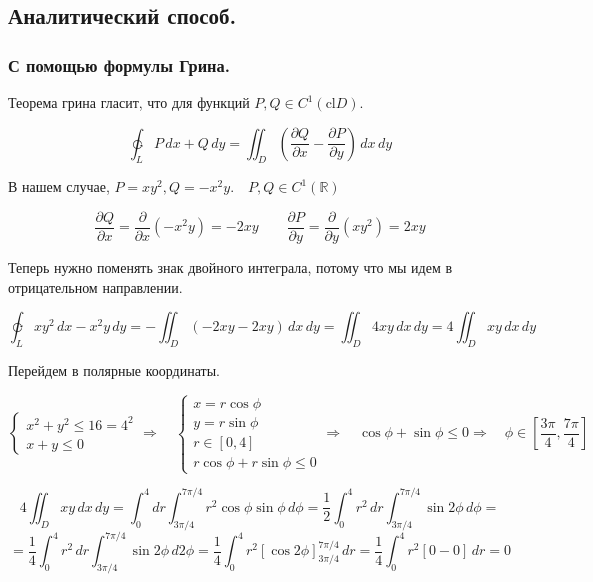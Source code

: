 \subsection{Аналитический способ.}
\subsubsection{С помощью формулы Грина.}
\begin{center}
    
Теорема грина гласит, что для функций $P,Q \in C^1(\text{cl}D)$.

$$\ointctrclockwise_{L} P \, dx + Q \, dy = \iint_{D} \left( \dfrac{\partial Q}{\partial x} - \dfrac{\partial P}{\partial y} \right)\,dx\,dy$$

В нашем случае, $P=xy^2, Q=-x^2y. \quad P,Q \in C^1(\mathbb{R})$

$$\dfrac{\partial Q}{\partial x} = \dfrac{\partial}{\partial x}\left(-x^2y\right) = -2xy \quad\quad \dfrac{\partial P}{\partial y} = \dfrac{\partial}{\partial y}\left(xy^2\right) = 2xy $$

Теперь нужно поменять знак двойного интеграла, потому что мы идем в отрицательном направлении.

$$ \varointclockwise_L xy^2 \,dx - x^2y \,dy = - \iint_D (-2xy - 2xy)\,dx\,dy = \iint_D 4xy \,dx\,dy = 4\iint_D xy \,dx\,dy$$

Перейдем в полярные координаты. 

$$
\begin{cases}
    x^2+y^2 \leq 16 = 4^2\\
    x+y\leq0
\end{cases} \Rightarrow\quad 
\begin{cases}
    x = r\cos{\phi}\\
    y = r\sin{\phi}\\
    r\in[0, 4]\\
    r\cos{\phi}+r\sin{\phi}\leq0
\end{cases} \Rightarrow\quad 
\cos{\phi}+\sin{\phi}\leq0 \Rightarrow\quad \phi\in\left[\dfrac{3\pi}{4}, \dfrac{7\pi}{4} \right]
$$

$$4\iint_D xy \,dx\,dy = \int_0^4 dr \int_{3\pi/4}^{7\pi/4} r^2\cos{\phi}\sin{\phi} \,d\phi = \dfrac{1}{2}\int_0^4 r^2\,dr\int_{3\pi/4}^{7\pi/4} \sin{2\phi} \,d\phi = $$
$$=\dfrac{1}{4}\int_0^4 r^2\,dr\int_{3\pi/4}^{7\pi/4} \sin{2\phi} \,d2\phi = \dfrac{1}{4}\int_0^4 r^2 \left[ \cos{2\phi} \right]_{3\pi/4}^{7\pi/4}  \,dr  = \dfrac{1}{4}\int_0^4 r^2 \left[ 0-0 \right]\,dr = \boxed{0} $$
\end{center}


